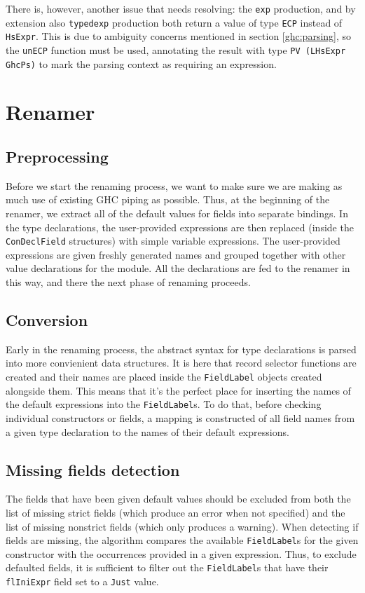 \documentclass[en]{pracamgr}
\newcommand{\code}[1]{\lstinline[breaklines=true]{#1}}
\begin{document}
There is, however, another issue that needs resolving: the \code{exp} production, and by extension also \code{typedexp} 
production both return a value of type \code{ECP} instead of \code{HsExpr}. This is due to ambiguity concerns 
mentioned in section \ref*{ghc:parsing}, so the \code{unECP} function must be used, 
annotating the result with type \code{PV (LHsExpr GhcPs)} to mark the parsing context as requiring an expression.

\section{Renamer}\label{impl:renamer}
\subsection{Preprocessing}
Before we start the renaming process, we want to make sure we are making as much use of existing GHC piping as possible.
Thus, at the beginning of the renamer, we extract all of the default values for fields into separate bindings.
In the type declarations, the user-provided expressions are then replaced (inside the \code{ConDeclField} structures) with simple variable expressions.
The user-provided expressions are given freshly generated names and grouped together with other value declarations for the module.
All the declarations are fed to the renamer in this way, and there the next phase of renaming proceeds.
\subsection{Conversion}
Early in the renaming process, the abstract syntax for type declarations is parsed into more convienient data structures.
It is here that record selector functions are created and their names are placed inside the \code{FieldLabel} objects created alongside them.
This means that it's the perfect place for inserting the names of the default expressions into the \code{FieldLabel}s.
To do that, before checking individual constructors or fields, a mapping is constructed of all field names from a given type declaration to the names of their default expressions.
\subsection{Missing fields detection}
The fields that have been given default values should be excluded from both the list of missing strict fields 
(which produce an error when not specified) and the list of missing nonstrict fields (which only produces a warning).
When detecting if fields are missing, the algorithm compares the available \code{FieldLabel}s for the given constructor with the occurrences provided in a given expression.
Thus, to exclude defaulted fields, it is sufficient to filter out the \code{FieldLabel}s that have their \code{flIniExpr} field set to a \code{Just} value.
\end{document}
